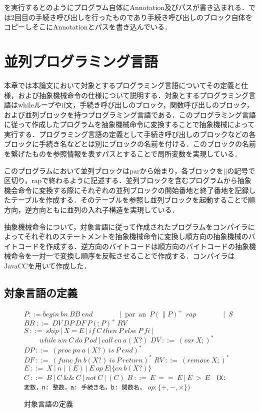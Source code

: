 \documentclass[submit,PRO]{ipsj}
\def\|{\verb|}
\begin{document}
を実行するとのようにプログラム自体にAnnotation及びパスが書き込まれる．では2回目の手続き呼び出しを行ったものであり手続き呼び出しのブロック自体をコピーしそこにAnnotationとパスを書き込んでいる．

%3
\section{並列プログラミング言語}

本章では本論文において対象とするプログラミング言語についてその定義と仕様，および抽象機械命令の仕様について説明する．対象とするプログラミング言語はwhileループやif文，手続き呼び出しのブロック，関数呼び出しのブロック，および並列ブロックを持つプログラミング言語である．このプログラミング言語に従って作成したプログラムを抽象機械命令に変換することで抽象機械によって実行する．プログラミング言語の定義として手続き呼び出しのブロックなどの各ブロックに手続き名などとは別にブロックの名前を付ける．このブロックの名前を繋げたものを参照情報を表すパスとすることで局所変数を実現している．

このプログラムにおいて並列ブロックはparから始まり，各ブロックを$||$の記号で区切り，rapで終わるように記述する．並列ブロックを含むプログラムから抽象機会命令に変換する際にそれぞれの並列ブロックの開始番地と終了番地を記録したテーブルを作成する．そのテーブルを参照し並列ブロックを起動することで順方向，逆方向ともに並列の入れ子構造を実現している．

抽象機械命令について，対象言語に従って作成されたプログラムをコンパイラによってそれぞれのステートメントを抽象機械命令に変換し順方向の抽象機械のバイトコードを作成する．逆方向のバイトコードは順方向のバイトコードの抽象機械命令を一対一で変換し順序を反転させることで作成する．コンパイラはJavaCCを用いて作成した．

\subsection{対象言語の定義}
\label{sec:3.1}

\begin{figure}[tb]
\vbox{
\hbox{$P ::= begin\ bn\ BB\ end$}
\hbox{\ \ \ \ \ \ \ $|$ par an $P(\parallel P)^+$ $rap$}
\hbox{\ \ \ \ \ \ \ $|$ $S$}
\hbox{$BB\ ::=\ DV\ DP\ DF\ P(;P)^+\ RV$}
\hbox{$S\ ::=\ skip\ |\  X = E\ |\ if\ C\ then\ P\ else\ P\ fi\ |$}
\hbox{$\ \ \ \ \ \ \ \ \ \  while\ wn\ C\ do\ P\ od\ |\ call\ cn\ a(X?)$}
\hbox{$DV\ ::=\ (var\ X;)^*$}
\hbox{$DP\ ::=\ (proc\ pn\ a(X?)\ is\ P\ end)^*$}
\hbox{$DF\ ::=\ (func\ fn\ b(X?)\ is\ P\ return)^*$}
\hbox{$RV\ ::=\ (remove\ X;)^*$}
\hbox{$E\ ::=\ X\ |\ n\ |\ (E)\ |\ E\ op\ E | \{cn\ b(X?)\}$}
\hbox{$C\ ::=\ B\ |\ C\ \&\& \ C\ |\ not\ C\ |\ (C)$}
\hbox{$B\ ::=\ E\ ==\ E\ |\ E\ >\ E$}
\hbox{\\}
\hbox{\| (X: 変数，n: 整数，a: 手続き名，b: 関数名，|}
\hbox{$op: \{+,-,\times \})$}
}
\centerline{}
\caption{対象言語の定義}
\label{fig:def}
\end{figure}
\end{document}
